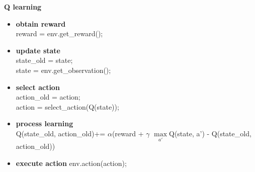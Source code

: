 \documentclass[xcolor=dvipsnames]{beamer}
\begin{document}
\begin{frame}{\bf Q learning}

\begin{itemize}
  \item {\color{red} \bf obtain reward} \\
        reward = env.get\_reward();

  \item {\color{red} \bf update state} \\
        state\_old = state; \\
        state = env.get\_observation(); \\

  \item {\color{red} \bf select action} \\
        action\_old = action; \\
        action = select\_action(Q(state)); \\

  \item {\color{red} \bf process learning} \\
    Q(state\_old, action\_old)+= $\alpha$(reward + $\gamma$ $\max \limits_{a'}$Q(state, a') - Q(state\_old, action\_old))

  \item {\color{red} \bf execute action}
    env.action(action);

\end{itemize}


\end{frame}
\end{document}
